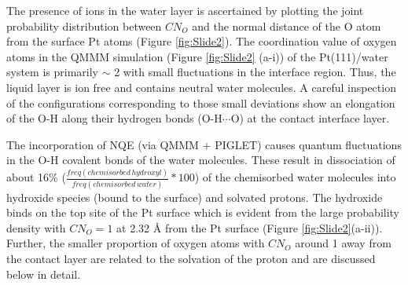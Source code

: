 The presence of ions in the water layer is ascertained by plotting the 
joint probability distribution between $CN_O$ and the normal distance
of the O atom from the surface Pt atoms (Figure \ref{fig:Slide2}). The coordination value of oxygen atoms in the QMMM 
simulation (Figure \ref{fig:Slide2} (a-i)) of the Pt(111)/water system  
is primarily $\sim$ 2 with small fluctuations in the interface region. 
Thus, the liquid layer is ion free and contains neutral water molecules. 
A careful inspection of the configurations corresponding to those small 
deviations show an elongation of the O-H along their hydrogen bonds (O-H$\cdots$O) at the contact interface layer. 

The incorporation of NQE (via QMMM $+$ PIGLET) causes quantum fluctuations in the O-H covalent bonds of the water molecules. 
These result in dissociation of about 16\% ($\frac {freq (chemisorbed\, hydroxyl)}{freq (chemisorbed\, water)} * 100$) of the chemisorbed water molecules into hydroxide species (bound to the surface) and solvated protons. The hydroxide binds on the top site of the Pt surface which is evident from the large probability density with $CN_{O} = 1$ at 2.32 \AA{} from the Pt surface (Figure \ref{fig:Slide2}(a-ii)). Further, the smaller proportion of oxygen atoms with $CN_{O}$ around 1 away from the contact layer are related to the solvation of the proton and are discussed below in detail. 

